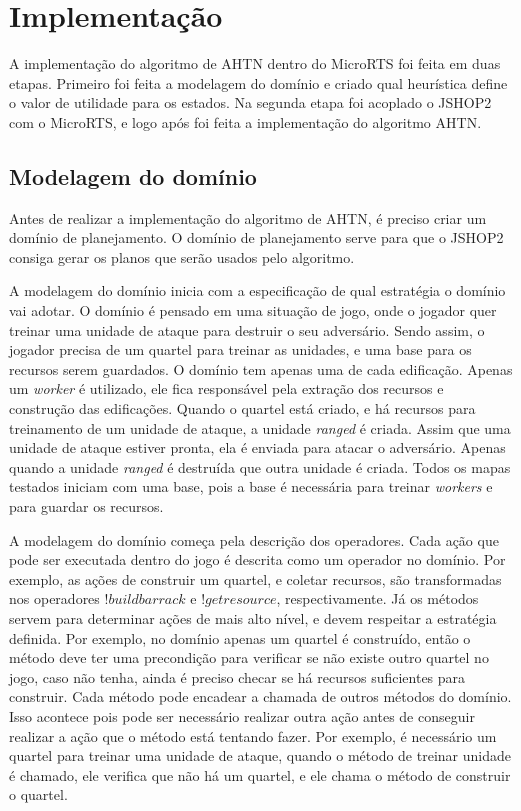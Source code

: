 
\chapter{\label{chap:impl}Implementação}

A implementação do algoritmo de AHTN dentro do MicroRTS foi feita em duas etapas.
Primeiro foi feita a modelagem do domínio e criado qual heurística define o valor de utilidade para os estados.
Na segunda etapa foi acoplado o JSHOP2 com o MicroRTS, e logo após foi feita a implementação do algoritmo AHTN.

\section{Modelagem do domínio}

Antes de realizar a implementação do algoritmo de AHTN, é preciso criar um domínio de planejamento. 
O domínio de planejamento serve para que o JSHOP2 consiga gerar os planos que serão usados pelo algoritmo.

A modelagem do domínio inicia com a especificação de qual estratégia o domínio vai adotar.
O domínio é pensado em uma situação de jogo, onde o jogador quer treinar uma unidade de ataque para destruir o seu adversário.
Sendo assim, o jogador precisa de um quartel para treinar as unidades, e uma base para os recursos serem guardados.
O domínio tem apenas uma de cada edificação.
Apenas um \textit{worker} é utilizado, ele fica responsável pela extração dos recursos e construção das edificações.
Quando o quartel está criado, e há recursos para treinamento de um unidade de ataque, a unidade \textit{ranged} é criada.
Assim que uma unidade de ataque estiver pronta, ela é enviada para atacar o adversário.
Apenas quando a unidade \textit{ranged} é destruída que outra unidade é criada.
Todos os mapas testados iniciam com uma base, pois a base é necessária para treinar \textit{workers} e para guardar os recursos.  

A modelagem do domínio começa pela descrição dos operadores.
Cada ação que pode ser executada dentro do jogo é descrita como um operador no domínio.
Por exemplo, as ações de construir um quartel, e coletar recursos, são transformadas nos operadores $!buildbarrack$ e $!getresource$, respectivamente.
Já os métodos servem para determinar ações de mais alto nível, e devem respeitar a estratégia definida.
Por exemplo, no domínio apenas um quartel é construído, então o método deve ter uma precondição para verificar se não existe outro quartel no jogo, caso não tenha, ainda é preciso checar se há recursos suficientes para construir. 
Cada método pode encadear a chamada de outros métodos do domínio.
Isso acontece pois pode ser necessário realizar outra ação antes de conseguir realizar a ação que o método está tentando fazer.
Por exemplo, é necessário um quartel para treinar uma unidade de ataque, quando o método de treinar unidade é chamado, ele verifica que não há um quartel, e ele chama o método de construir o quartel.

